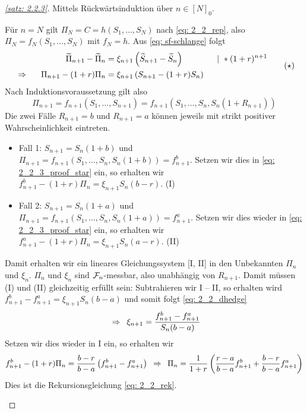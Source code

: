 \begin{proof}[\cref{satz: 2.2.3}]
	Mittels Rückwärtsinduktion über $n \in [N]_0$.
	\begin{description}
		\ianfang Für $n = N$ gilt $\Pi_N = C = h(S_1, \dots, S_N)$ nach \eqref{eq: 2_2_rep}, also $\Pi_N = f_N(S_1, \dots, S_N)$ mit $f_N = h$.
		\ischritt Aus \eqref{eq: sf-schlange} folgt
		\begin{equation*}
			\begin{aligned}
				\widetilde{\Pi}_{n+1} - \widetilde{\Pi}_n &= \xi_{n+1} \left( \widetilde{S}_{n+1} - \widetilde{S}_n \right) \qquad\qquad | \ * (1+r)^{n+1} \\
				\enskip \Rightarrow \enskip  \quad \Pi_{n+1} - (1+r) \Pi_n &= \xi_{n+1} \left( S_{n+1} - (1+r) S_n \right)
			\end{aligned} \tag{$\star$} \label{eq: 2_2_3_proof_star}
		\end{equation*}
		Nach Induktionsvoraussetzung gilt also
		\begin{equation*}
			\Pi_{n+1} = f_{n+1} (S_1, \dots, S_{n+1}) = f_{n+1} (S_1, \dots, S_n, S_n (1+R_{n+1}))
		\end{equation*}
		Die zwei Fälle $R_{n+1} = b$ und $R_{n+1} = a$ können jeweils mit strikt positiver Wahrscheinlichkeit eintreten.
		\begin{itemize}
			\item Fall 1: $S_{n+1} = S_n (1+b)$ und $\Pi_{n+1} = f_{n+1}(S_1, \dots, S_n, S_n(1+b)) = f_{n+1}^b$. Setzen wir dies in \eqref{eq: 2_2_3_proof_star} ein, so erhalten wir $f_{n+1}^b - (1+r) \Pi_n = \xi_{n+1} S_n (b-r)$. \hfill (I)
			\item Fall 2: $S_{n+1} = S_n (1+a)$ und $\Pi_{n+1} = f_{n+1}(S_1, \dots, S_n, S_n(1+a)) = f_{n+1}^a$. Setzen wir dies wieder in \eqref{eq: 2_2_3_proof_star} ein, so erhalten wir $f_{n+1}^a - (1+r) \Pi_n = \xi_{n+1} S_n (a-r)$. \hfill (II)
		\end{itemize}
	Damit erhalten wir ein lineares Gleichungssystem [I, II] in den Unbekannten $\Pi_n$ und $\xi_n$. 
	$\Pi_n$ und $\xi_n$ sind $\mathcal{F}_n$-messbar, also unabhängig von $R_{n+1}$. Damit müssen (I) und (II) gleichzeitig erfüllt sein: Subtrahieren wir I -- II, so erhalten wird $f_{n+1}^b - f_{n+1}^a = \xi_{n+1} S_n (b-a)$ und somit folgt \eqref{eq: 2_2_dhedge}
	\begin{equation*}
		\enskip \Rightarrow \enskip \xi_{n+1} = \frac{f_{n+1}^b - f_{n+1}^a}{S_n (b-a)}
	\end{equation*}
	Setzen wir dies wieder in I ein, so erhalten wir
	\begin{equation*}
		f_{n+1}^b - (1+r) \Pi_n = \frac{b-r}{b-a} \left( f_{n+1}^b - f_{n+1}^a \right) \enskip \Rightarrow \enskip \Pi_n = \frac{1}{1+r} \left( \frac{r-a}{b-a} f_{n+1}^b + \frac{b-r}{b-a} f_{n+1}^a \right)
	\end{equation*}
	Dies ist die Rekursionsgleichung \eqref{eq: 2_2_rek}.
	\end{description}
\end{proof}

